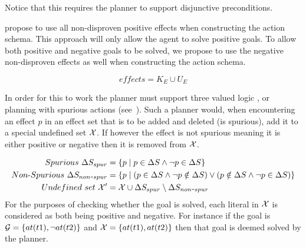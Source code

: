 \documentclass[\master/Master.tex]{subfiles}
\begin{document}
	Notice that this requires the planner to support disjunctive preconditions.

	\cite{Walsh2008} propose to use all non-disproven positive effects when constructing the action schema. 
	This approach will only allow the agent to solve positive goals.
	To allow both positive and negative goals to be solved, we propose to use the negative non-disproven effects as well when constructing the action schema.

	\begin{equation}
        \textit{effects} =  K_E \cup U_E
	\end{equation}

    In order for this to work the planner must support three valued logic \cite{putnam1957a}, or planning with spurious actions (see~\cite{Russell}).
	Such a planner would, when encountering an effect $p$ in an effect set \geffects that is to be added and deleted (is spurious), add it to a special undefined set $\mathcal{X}$.
	If however the effect is not spurious meaning it is either positive or negative then it is removed from $\mathcal{X}$.

			\begin{equation}
				\begin{split}
					Spurious~\Delta S_{spur} &= \{ p \mid p \in \Delta S \land \neg p \in \Delta S \} \\
					Non\text{-}Spurious~\Delta S_{non\texttt{-}spur} &= \{ p \mid (p \in \Delta S \land \neg p \notin \Delta S ) \lor (p \notin \Delta S \land \neg p \in \Delta S )  \}\\
					Undefined~set~\mathcal{X}' &= \mathcal{X} \cup \Delta S_{spur} \setminus \Delta S_{non\texttt{-}spur}
				\end{split}
			\end{equation}
	For the purposes of checking whether the goal is solved, each literal in $\mathcal{X}$ is considered as both being positive and negative.
	For instance if the goal is $\mathcal{G} = \{at(t1), \neg at(t2)\}$ and $\mathcal{X} = \{at(t1), at(t2)\}$ then that goal is deemed solved by the planner.
\end{document}
